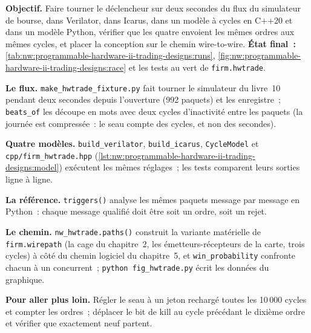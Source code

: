 \begin{tutorial}
\textbf{Objectif.} Faire tourner le déclencheur sur deux secondes du flux du simulateur de bourse, dans Verilator, dans Icarus, dans un modèle à cycles en C++20 et dans
un modèle Python, vérifier que les quatre envoient les mêmes ordres aux mêmes cycles, et placer la conception sur le chemin wire-to-wire.
\textbf{État final~:} \cref{tab:nw:programmable-hardware-ii-trading-designs:runs}, \cref{fig:nw:programmable-hardware-ii-trading-designs:race}
et les tests au vert de \texttt{firm.hwtrade}.
\begin{tutsteps}
\item \textbf{Le flux.} \texttt{make\_hwtrade\_fixture.py} fait tourner le simulateur du livre~10 pendant deux secondes depuis l'ouverture (992 paquets)
  et les enregistre~; \texttt{beats\_of} les découpe en mots avec deux cycles d'inactivité entre les paquets (la journée est compressée~: le seau compte
  des cycles, et non des secondes).
\item \textbf{Quatre modèles.} \texttt{build\_verilator}, \texttt{build\_icarus}, \texttt{CycleModel} et \texttt{cpp/firm\_hwtrade.hpp}
  (\cref{lst:nw:programmable-hardware-ii-trading-designs:model}) exécutent les mêmes réglages~; les tests comparent leurs sorties ligne à ligne.
\item \textbf{La référence.} \texttt{triggers()} analyse les mêmes paquets message par message en Python~: chaque message qualifié doit être
  soit un ordre, soit un rejet.
\item \textbf{Le chemin.} \texttt{nw\_hwtrade.paths()} construit la variante matérielle de \texttt{firm.wirepath} (la cage du chapitre~2, les
  émetteurs-récepteurs de la carte, trois cycles) à côté du chemin logiciel du chapitre~5, et \texttt{win\_probability} confronte chacun à un concurrent~;
  \texttt{python fig\_hwtrade.py} écrit les données du graphique.
\end{tutsteps}
\textbf{Pour aller plus loin.} Régler le seau à un jeton rechargé toutes les 10\,000 cycles et compter les ordres~; déplacer le bit de kill au
cycle précédant le dixième ordre et vérifier que exactement neuf partent.
\end{tutorial}

\label{lst:nw:programmable-hardware-ii-trading-designs:model}

